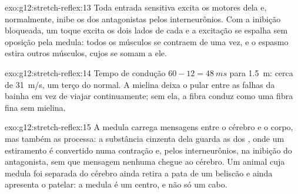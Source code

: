 \begin{solution}{exo:g12:stretch-reflex:13}
Toda entrada sensitiva excita os  motores dela e, normalmente,
inibe os dos antagonistas pelos interneurônios. Com a inibição
bloqueada, um toque excita os dois lados de cada  e a
excitação se espalha sem oposição pela medula: todos os músculos se
contraem de uma vez, e o espasmo estira outros músculos, cujos 
se somam a ele.
\end{solution}

\begin{solution}{exo:g12:stretch-reflex:14}
Tempo de condução $60 - 12 = \qty{48}{ms}$ para \qty{1.5}{m}: cerca de
\qty{31}{m/s}, um terço do normal. A mielina deixa o 
pular entre as falhas da bainha em vez de viajar continuamente; sem
ela, a fibra conduz como uma fibra fina sem mielina.
\end{solution}

\begin{solution}{exo:g12:stretch-reflex:15}
A medula carrega mensagens entre o cérebro e o corpo, mas também as
processa: a substância cinzenta dela guarda as  dos , onde um estiramento é convertido numa contração e, pelos
interneurônios, na inibição do antagonista, sem que mensagem nenhuma
chegue ao cérebro. Um animal cuja medula foi separada do cérebro ainda
retira a pata de um beliscão e ainda apresenta o  patelar: a
medula é um centro, e não só um cabo.
\end{solution}

